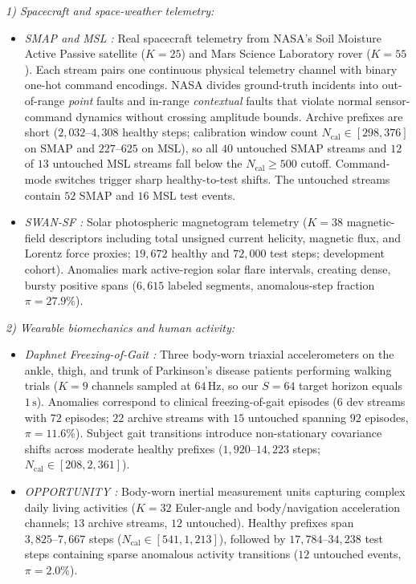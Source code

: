 \documentclass[journal]{IEEEtran}
\begin{document}
\noindent\emph{1) Spacecraft and space-weather telemetry:}
\begin{itemize}[leftmargin=*, nosep, itemsep=1.5pt]
    \item \emph{SMAP and MSL \cite{Hundman2018b}:} Real spacecraft telemetry from NASA's Soil Moisture Active Passive satellite ($K{=}25$) and Mars Science Laboratory rover ($K{=}55$). Each stream pairs one continuous physical telemetry channel with binary one-hot command encodings. NASA divides ground-truth incidents into out-of-range \emph{point} faults and in-range \emph{contextual} faults that violate normal sensor-command dynamics without crossing amplitude bounds. Archive prefixes are short ($2{,}032\text{--}4{,}308$ healthy steps; calibration window count $N_{\text{cal}}\in[298,376]$ on SMAP and $227\text{--}625$ on MSL), so all $40$ untouched SMAP streams and $12$ of $13$ untouched MSL streams fall below the $N_{\text{cal}}{\ge}500$ cutoff. Command-mode switches trigger sharp healthy-to-test shifts. The untouched streams contain $52$ SMAP and $16$ MSL test events.
    \item \emph{SWAN-SF \cite{angryk2020multivariate}:} Solar photospheric magnetogram telemetry ($K{=}38$ magnetic-field descriptors including total unsigned current helicity, magnetic flux, and Lorentz force proxies; $19{,}672$ healthy and $72{,}000$ test steps; development cohort). Anomalies mark active-region solar flare intervals, creating dense, bursty positive spans ($6{,}615$ labeled segments, anomalous-step fraction $\pi{=}27.9\%$).
\end{itemize}

\noindent\emph{2) Wearable biomechanics and human activity:}
\begin{itemize}[leftmargin=*, nosep, itemsep=1.5pt]
    \item \emph{Daphnet Freezing-of-Gait \cite{bachlin2010wearable}:} Three body-worn triaxial accelerometers on the ankle, thigh, and trunk of Parkinson's disease patients performing walking trials ($K{=}9$ channels sampled at $64\,\text{Hz}$, so our $S{=}64$ target horizon equals $1\,\text{s}$). Anomalies correspond to clinical freezing-of-gait episodes ($6$ dev streams with $72$ episodes; $22$ archive streams with $15$ untouched spanning $92$ episodes, $\pi{=}11.6\%$). Subject gait transitions introduce non-stationary covariance shifts across moderate healthy prefixes ($1{,}920\text{--}14{,}223$ steps; $N_{\text{cal}}\in[208,2{,}361]$).
    \item \emph{OPPORTUNITY \cite{roggen2010collecting}:} Body-worn inertial measurement units capturing complex daily living activities ($K{=}32$ Euler-angle and body/navigation acceleration channels; $13$ archive streams, $12$ untouched). Healthy prefixes span $3{,}825\text{--}7{,}667$ steps ($N_{\text{cal}}\in[541,1{,}213]$), followed by $17{,}784\text{--}34{,}238$ test steps containing sparse anomalous activity transitions ($12$ untouched events, $\pi{=}2.0\%$).
\end{itemize}
\end{document}
